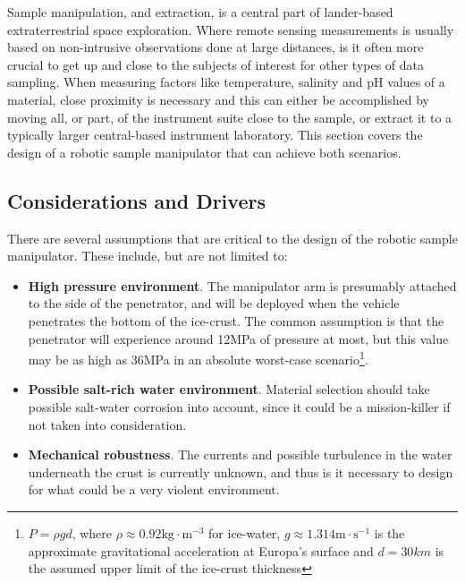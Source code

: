 Sample manipulation, and extraction, is a central part of lander-based extraterrestrial space exploration. Where remote sensing measurements is usually based on non-intrusive observations done at large distances, is it often more crucial to get up and close to the subjects of interest for other types of data sampling. When measuring factors like temperature, salinity and pH values of a material, close proximity is necessary and this can either be accomplished by moving all, or part, of the instrument suite close to the sample, or extract it to a typically larger central-based instrument laboratory. This section covers the design of a robotic sample manipulator that can achieve both scenarios.

\subsection{Considerations and Drivers}
There are several assumptions that are critical to the design of the robotic sample manipulator. These include, but are not limited to:
\\ 
\begin{itemize}
\item \textbf{High pressure environment}. The manipulator arm is presumably attached to the side of the penetrator, and will be deployed when the vehicle penetrates the bottom of the ice-crust. The common assumption is that the penetrator will experience around 12MPa of pressure at most, but this value may be as high as 36MPa in an absolute worst-case scenario\footnote{$P=\rho g d$, where $\rho\approx 0.92 \mathrm{kg\cdot m^{-3}}$ for ice-water, $g\approx 1.314\mathrm{m\cdot s^{-1}}$ is the approximate gravitational acceleration at Europa's surface and $d=30km$ is the assumed upper limit of the ice-crust thickness}.
\item \textbf{Possible salt-rich water environment}. Material selection should take possible salt-water corrosion into account, since it could be a mission-killer if not taken into consideration. 
\item \textbf{Mechanical robustness}. The currents and possible turbulence in the water underneath the crust is currently unknown, and thus is it necessary to design for what could be a very violent environment. 
\end{itemize}

